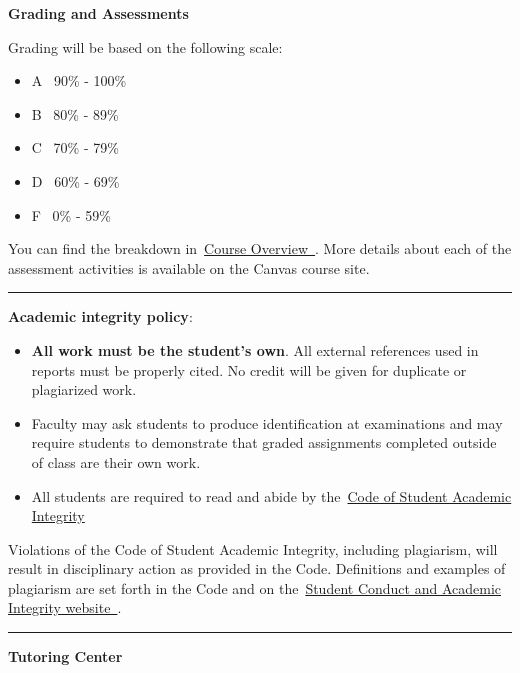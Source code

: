 \documentclass[
]{article}
\providecommand{\tightlist}{%
  \setlength{\itemsep}{0pt}\setlength{\parskip}{0pt}}
\begin{document}
\textbf{Grading and Assessments}

Grading will be based on the following scale:

\begin{itemize}
\tightlist
\item
  A~ 90\% - 100\%
\item
  B~ 80\% - 89\%
\item
  C~ 70\% - 79\%
\item
  D~ 60\% - 69\%
\item
  F~ 0\% - 59\%
\end{itemize}

You can find the breakdown
in~\href{https://instructure.charlotte.edu/courses/$CANVAS_COURSE_REFERENCE$/modules/items/g12bc07101b82cdbb0110e8daf740ba16}{Course
Overview~}. More details about each of the assessment activities is
available on the Canvas course site.

\begin{center}\rule{0.5\linewidth}{0.5pt}\end{center}

\textbf{Academic integrity policy}:

\begin{itemize}
\tightlist
\item
  \textbf{All work must be the student's own}. All external references
  used in reports must be properly cited. No credit will be given for
  duplicate or plagiarized work.
\item
  Faculty may ask students to produce identification at examinations and
  may require students to demonstrate that graded assignments completed
  outside of class are their own work.
\item
  All students are required to read and abide by
  the~\href{https://legal.uncc.edu/policies/up-407}{Code of Student
  Academic Integrity}
\end{itemize}

Violations of the Code of Student Academic Integrity, including
plagiarism, will result in disciplinary action as provided in the Code.
Definitions and examples of plagiarism are set forth in the Code and on
the~\href{https://scai.uncc.edu/academic-integrity/academic-misconduct-policies-examples-0}{Student
Conduct and Academic Integrity website~}.

\begin{center}\rule{0.5\linewidth}{0.5pt}\end{center}

\textbf{Tutoring Center}
\end{document}
